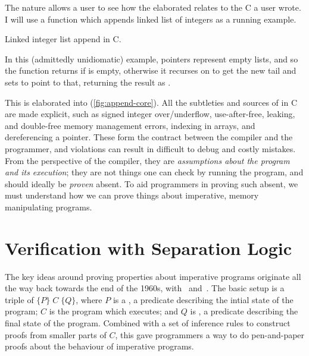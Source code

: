 The  nature allows a user to see how the
elaborated  relates to the C a user wrote. I will use a function which
appends linked list of integers as a running example.

\begin{marginfigure}
    \centering
    \caption{Linked integer list append in C.}\label{fig:append-c}
\end{marginfigure}%

In this (admittedly unidiomatic) example,  pointers represent
empty lists, and so the function returns  if  is empty,
otherwise it recurses on  to get the new tail
 and sets  to point to that,  returning the
result as .

This is elaborated into  (\cref{fig:append-core}). All the
subtleties and sources of  in C are made explicit, such as signed integer over/underflow,
use-after-free, leaking, and double-free memory management errors,
 indexing in arrays, and dereferencing a 
pointer. These form the contract between the compiler and the programmer, and
violations can result in difficult to debug and costly mistakes. From the
perspective of the compiler, they are \emph{assumptions about the program and
its execution}; they are not things one
can check by running the program, and should ideally be \emph{proven}
absent. To aid programmers in
proving such  absent, we must understand how we can prove things about
imperative, memory manipulating programs.

\section{Verification with Separation Logic}\label{sec:sep-logic-intro}

The key ideas around proving properties about imperative programs originate all
the way back towards the end of the 1960s, with~\citeauthor{floyd1993assigning}
and~\citeauthor{hoare1969axiomatic}. The basic setup is a triple of
$\{P\} \;C \; \{Q\}$, where $P$ is a , a predicate describing the
intial state of the program; $C$ is the program which executes; and $Q$ is
, a predicate describing the final state of the program.
Combined with a set of inference rules to construct proofs from smaller parts
of $C$, this gave programmers a way to do pen-and-paper proofs about the
behaviour of imperative programs.

